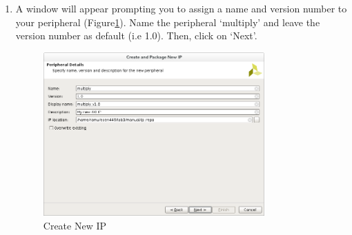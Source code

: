 \documentclass[11pt,twoside,titlepage]{article}
\begin{document}
\begin{enumerate}
	\item A window will appear prompting you to assign a name and 
	version number to your peripheral (Figure\ref{ip}). 
	Name the peripheral `multiply' and leave 
	the version number as default (i.e 1.0). Then, click on `Next'.
	
	\begin{figure}[!h]
		\begin{center}
			\includegraphics[width=0.8\textwidth]{ip}
			\caption{Create New IP}
			\label{ip}
		\end{center}
	\end{figure}
	

\end{enumerate}
\end{document}
